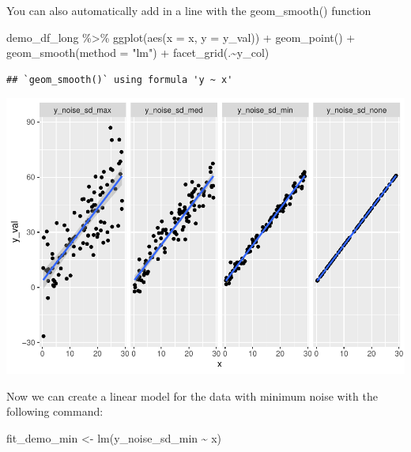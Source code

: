 \documentclass[
]{book}
\newenvironment{Shaded}{\begin{snugshade}}{\end{snugshade}}
\newcommand{\AttributeTok}[1]{\textcolor[rgb]{0.77,0.63,0.00}{#1}}
\newcommand{\FunctionTok}[1]{\textcolor[rgb]{0.00,0.00,0.00}{#1}}
\newcommand{\NormalTok}[1]{#1}
\newcommand{\OtherTok}[1]{\textcolor[rgb]{0.56,0.35,0.01}{#1}}
\newcommand{\SpecialCharTok}[1]{\textcolor[rgb]{0.00,0.00,0.00}{#1}}
\newcommand{\StringTok}[1]{\textcolor[rgb]{0.31,0.60,0.02}{#1}}
\begin{document}
You can also automatically add in a line with the geom\_smooth() function

\begin{Shaded}
\begin{Highlighting}[]
\NormalTok{demo\_df\_long }\SpecialCharTok{\%\textgreater{}\%} 
  \FunctionTok{ggplot}\NormalTok{(}\FunctionTok{aes}\NormalTok{(}\AttributeTok{x =}\NormalTok{ x, }\AttributeTok{y =}\NormalTok{ y\_val)) }\SpecialCharTok{+}
  \FunctionTok{geom\_point}\NormalTok{() }\SpecialCharTok{+}
  \FunctionTok{geom\_smooth}\NormalTok{(}\AttributeTok{method =} \StringTok{"lm"}\NormalTok{) }\SpecialCharTok{+} 
  \FunctionTok{facet\_grid}\NormalTok{(.}\SpecialCharTok{\textasciitilde{}}\NormalTok{y\_col)}
\end{Highlighting}
\end{Shaded}

\begin{verbatim}
## `geom_smooth()` using formula 'y ~ x'
\end{verbatim}

\includegraphics{test_course_notes_files/figure-latex/remedy015-1.pdf}

Now we can create a linear model for the data with minimum noise with the following command:

\begin{Shaded}
\begin{Highlighting}[]
\NormalTok{fit\_demo\_min }\OtherTok{\textless{}{-}} \FunctionTok{lm}\NormalTok{(y\_noise\_sd\_min }\SpecialCharTok{\textasciitilde{}}\NormalTok{ x)}
\end{Highlighting}
\end{Shaded}
\end{document}
